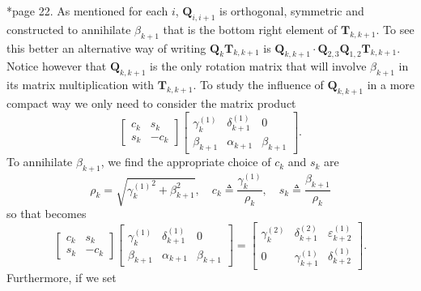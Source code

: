 \cite{ChoiSou-ChengTerrya2007Imfs}*{page 22}. As mentioned for each $i$, $\bm{Q}_{i,i+1}$ is orthogonal, symmetric and constructed to annihilate $\beta_{k+1}$ that is the bottom right element of $\bm{T}_{k,k+1}$. To see this better an alternative way of writing $\bm{Q}_k \bm{T}_{k,k+1}$ is $\bm{Q}_{k,k+1} \cdot \bm{Q}_{2,3}\bm{Q}_{1,2} \bm{T}_{k,k+1}$. Notice however that $\bm{Q}_{k,k+1}$ is the only rotation matrix that will involve $\beta_{k+1}$ in its matrix multiplication with $\bm{T}_{k,k+1}$. To study the influence of $\bm{Q}_{k,k+1}$ in a more compact way we only need to consider the matrix product
\begin{equation} \label{eq: iso_Qkk1_mat_vec_prod_1}
    \begin{bmatrix}
        c_k & s_k  \\
        s_k & -c_k
    \end{bmatrix}
    \begin{bmatrix}
        \gamma_{k}^{(1)} & \delta_{k+1}^{(1)} & 0           \\
        \beta_{k+1}      & \alpha_{k+1}       & \beta_{k+1}
    \end{bmatrix}.
\end{equation}
To annihilate $\beta_{k+1}$, we find the appropriate choice of $c_k$ and $s_k$ are
\begin{equation*}
    \rho_k = \sqrt{{\gamma_k^{(1)}}^{2} + \beta_{k+1}^{2}}, \quad c_k \triangleq \frac{\gamma_{k}^{(1)}}{\rho_k}, \quad s_k \triangleq \frac{\beta_{k+1}}{\rho_{k}}
\end{equation*}
so that  becomes
\begin{equation*}
    \begin{bmatrix}
        c_k & s_k  \\
        s_k & -c_k
    \end{bmatrix}
    \begin{bmatrix}
        \gamma_{k}^{(1)} & \delta_{k+1}^{(1)} & 0           \\
        \beta_{k+1}      & \alpha_{k+1}       & \beta_{k+1}
    \end{bmatrix}
    =
    \begin{bmatrix}
        \gamma_{k}^{(2)} & \delta_{k+1}^{(2)} & \varepsilon_{k+2}^{(1)} \\
        0                & \gamma_{k+1}^{(1)} & \delta_{k+2}^{(1)}
    \end{bmatrix}.
\end{equation*}
Furthermore, if we set

